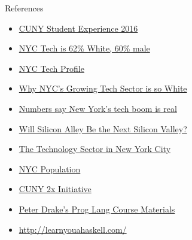 \documentclass[presetation]{beamer}
\begin{document}
\begin{frame}[label={sec:org20ac247}]{References}
\begin{itemize}
\item \href{http://www2.cuny.edu/wp-content/uploads/sites/4/page-assets/about/administration/offices/oira/institutional/surveys/SES\_Presentation\_EMC\_accessible.pdf}{CUNY Student Experience 2016}
\item \href{https://techcrunch.com/2015/08/20/new-york-citys-tech-industry-is-62-percent-white-60-percent-male/}{NYC Tech is 62\% White, 60\% male}
\item \href{https://nycfuture.org/data/nycs-tech-profile}{NYC Tech Profile}
\item \href{https://citylimits.org/2015/09/15/why-is-new-york-citys-growing-technology-sector-so-white/}{Why NYC's Growing Tech Sector is so White}
\item \href{http://www.crainsnewyork.com/article/20150706/BLOGS01/150709955/numbers-say-new-yorks-tech-boom-is-real}{Numbers say New York's tech boom is real}
\item \href{http://libertystreeteconomics.newyorkfed.org/2015/07/will-silicon-alley-be-the-next-silicon-valley.html\#.VZvrd-fDFB8}{Will Silicon Alley Be the Next Silicon Valley?}
\item \href{https://www.osc.state.ny.us/osdc/rpt4-2018.pdf}{The Technology Sector in New York City}
\item \href{http://worldpopulationreview.com/us-cities/new-york-city-population/}{NYC Population}
\item \href{http://www1.nyc.gov/office-of-the-mayor/news/677-17/de-blasio-administration-new-initiative-double-number-graduates-tech}{CUNY 2x Initiative}
\item \href{https://sites.google.com/a/lclark.edu/drake/courses/pls}{Peter Drake's Prog Lang Course Materials}
\item \url{http://learnyouahaskell.com/}
\end{itemize}
\end{frame}
\end{document}
